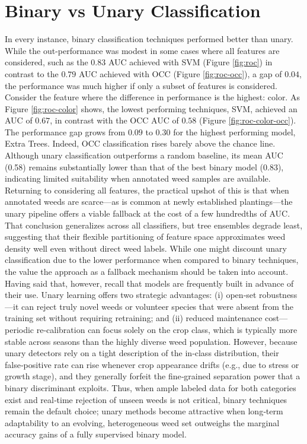 \documentclass[letterpaper, notitlepage]{report}
\begin{document}
\section{Binary vs Unary Classification}
In every instance, binary classification techniques performed better than unary. While the out-performance was modest in some cases where all features are considered, such as the $0.83$ \gls{AUC} achieved with \gls{SVM} (Figure \ref{fig:roc}) in contrast to the $0.79$ \gls{AUC} achieved with OCC (Figure \ref{fig:roc-occ}), a gap of $0.04$, the performance was much higher if only a subset of features is considered. Consider the feature where the difference in performance is the highest: color. As Figure \ref{fig:roc-color} shows, the lowest performing techniques, \gls{SVM}, achieved an AUC of $0.67$, in contrast with the \gls{OCC} \gls{AUC} of $0.58$ (Figure \ref{fig:roc-color-occ}). The performance gap grows from $0.09$ to $0.30$ for the highest performing model, Extra Trees.  Indeed, OCC classification rises barely above the chance line. Although unary classification outperforms a random baseline, its mean AUC (0.58) remains substantially lower than that of the best binary model (0.83), indicating limited suitability when annotated weed samples are available. 
Returning to considering all features, the practical upshot of this is  that when annotated
weeds are scarce---as is common at newly established plantings---the unary pipeline offers a viable fallback at the
cost of a few hundredths of AUC. That conclusion generalizes across all classifiers, but tree ensembles degrade
least, suggesting that their flexible partitioning of feature space approximates weed density well even without
direct weed labels. While one might discount unary classification due to the lower performance when compared to binary techniques, the value the approach as a fallback mechanism should be taken into account. Having said that, however, recall that models are frequently built in advance of their use. Unary learning offers two strategic advantages: (i) open‑set robustness---it can reject truly novel weeds or volunteer species that were absent from the training set without requiring retraining; and (ii) reduced maintenance cost---periodic re-calibration can focus solely on the crop class, which is typically more stable across seasons than the highly diverse weed population. However, because unary detectors rely on a tight description of the in‑class distribution, their false‑positive rate can rise whenever crop appearance drifts (e.g., due to stress or growth stage), and they generally forfeit the fine‑grained separation power that a binary discriminant exploits. Thus, when ample labeled data for both categories exist and real‑time rejection of unseen weeds is not critical, binary techniques remain the default choice; unary methods become attractive when long‑term adaptability to an evolving, heterogeneous weed set outweighs the marginal accuracy gains of a fully supervised binary model.
\end{document}
